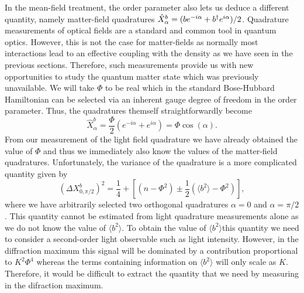 In the mean-field treatment, the order parameter also lets us deduce a
different quantity, namely matter-field quadratures
$\hat{X}^b_\alpha = (b e^{-i\alpha} + b^\dagger e^{i\alpha})/2$. Quadrature
measurements of optical fields are a standard and common tool in
quantum optics. However, this is not the case for matter-fields as
normally most interactions lead to an effective coupling with the
density as we have seen in the previous sections. Therefore, such
measurements provide us with new opportunities to study the quantum
matter state which was previously unavailable. We will take $\Phi$ to
be real which in the standard Bose-Hubbard Hamiltonian can be selected
via an inherent gauge degree of freedom in the order parameter. Thus,
the quadratures themself straightforwardly become
\begin{equation}
  \hat{X}^b_\alpha = \frac{\Phi}{2} (e^{-i\alpha} + e^{i\alpha}) =
  \Phi \cos(\alpha).
\end{equation}
From our measurement of the light field quadrature we have already
obtained the value of $\Phi$ and thus we immediately also know the
values of the matter-field quadratures. Unfortunately, the variance of
the quadrature is a more complicated quantity given by
\begin{equation} 
  (\Delta X^b_{0,\pi/2})^2 = \frac{1}{4} + [(n - \Phi^2) \pm
  \frac{1}{2}(\langle b^2 \rangle - \Phi^2)],
\end{equation} 
where we have arbitrarily selected two orthogonal quadratures
$\alpha =0 $ and $\alpha = \pi / 2$. This quantity cannot be estimated
from light quadrature measurements alone as we do not know the value
of $\langle b^2 \rangle$. To obtain the value of
$\langle b^2 \rangle$this quantity we need to consider a second-order
light observable such as light intensity. However, in the diffraction
maximum this signal will be dominated by a contribution proportional
to $K^2 \Phi^4$ whereas the terms containing information on
$\langle b^2 \rangle$ will only scale as $K$. Therefore, it would be
difficult to extract the quantity that we need by measuring in the
difraction maximum.

